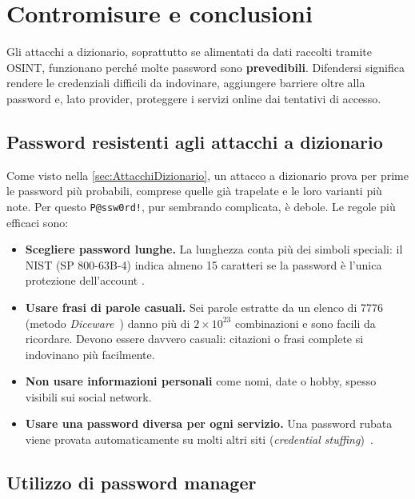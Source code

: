 \section{Contromisure e conclusioni}\label{sec:Contromisure}
 
Gli attacchi a dizionario, soprattutto se alimentati da dati raccolti tramite OSINT, funzionano perché molte password sono \textbf{prevedibili}. Difendersi significa rendere le credenziali difficili da indovinare, aggiungere barriere oltre alla password e, lato provider, proteggere i servizi online dai tentativi di accesso.
 
\subsection{Password resistenti agli attacchi a dizionario}\label{sec:pwd-resistenti}
 
Come visto nella \cref{sec:AttacchiDizionario}, un attacco a dizionario prova per prime le password più probabili, comprese quelle già trapelate e le loro varianti più note. Per questo \texttt{P@ssw0rd!}, pur sembrando complicata, è debole. Le regole più efficaci sono:
 
\begin{itemize}
    \item \textbf{Scegliere password lunghe.} La lunghezza conta più dei simboli speciali: il NIST (SP 800-63B-4) indica almeno 15 caratteri se la password è l'unica protezione dell'account \cite{nist80063b}.
    \item \textbf{Usare frasi di parole casuali.} Sei parole estratte da un elenco di 7776 (metodo \emph{Diceware}~\cite{diceware}) danno più di $2 \times 10^{23}$ combinazioni e sono facili da ricordare. Devono essere davvero casuali: citazioni o frasi complete si indovinano più facilmente.
    \item \textbf{Non usare informazioni personali} come nomi, date o hobby, spesso visibili sui social network.
    \item \textbf{Usare una password diversa per ogni servizio.} Una password rubata viene provata automaticamente su molti altri siti (\emph{credential stuffing})~\cite{owaspcredstuffing}.
\end{itemize}
 
\subsection{Utilizzo di password manager}\label{sec:pwd-manager}
 
